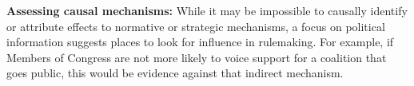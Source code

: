 







\textbf{Assessing causal mechanisms:}
While it may be impossible to causally identify or attribute effects to normative or strategic mechanisms, 
a focus on political information 
suggests places to look for influence in rulemaking. For example, if Members of Congress are not more likely to voice support for a coalition that goes public, this would be evidence against that indirect mechanism.


